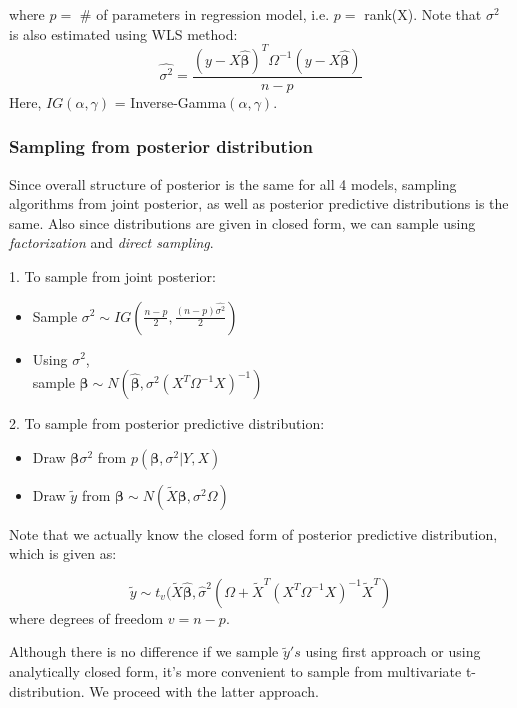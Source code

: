 \documentclass[11pt,twocolumn]{asaproc}
\begin{document}
where $p = $ \# of parameters in regression model, i.e. $p =$ rank(X). Note that $\sigma^2$ is also estimated using WLS method: $$\hat{\sigma^2} = \frac{(y-X\hat{\pmb{\beta}})^T \Omega^{-1} (y-X\hat{\pmb{\beta}})}{n-p}$$   Here, $IG(\alpha, \gamma)$ = Inverse-Gamma$(\alpha, \gamma)$. 


\subsubsection{Sampling from posterior distribution}

Since overall structure of posterior is the same for all 4 models, sampling algorithms from joint posterior, as well as posterior predictive distributions is the same. Also since distributions are given in closed form, we can sample using \textit{factorization} and \textit{direct sampling}.

\vspace{5mm}

1. To sample from joint posterior:

\begin{itemize}
\item Sample $\sigma^2 \sim IG (\frac{n-p}{2}, \frac{(n-p)\hat{\sigma^2}}{2})$
\item Using $\sigma^2$, \\ sample $\pmb{\beta} \sim N(\hat{\pmb{\beta}}, \sigma^2(X^{T}\Omega^{-1}X)^{-1})$
\end{itemize}


2. To sample from posterior predictive distribution:

\begin{itemize}
\item Draw $\pmb{\beta} \sigma^2$ from $p(\pmb{\beta}, \sigma^2 | Y, X)$
\item Draw $\tilde{y}$ from $\pmb{\beta} \sim N(\tilde{X}\pmb{\beta}, \sigma^2\Omega)$
\end{itemize}

Note that we actually know the closed form of posterior predictive distribution, which is given as: 

$$\tilde{y} \sim t_{v}(\tilde{X}\hat{\pmb{\beta}}, \hat{\sigma}^2(\Omega + \tilde{X}^T (X^T \Omega^{-1} X) ^{-1}\tilde{X}^T)$$ where degrees of freedom $v = n-p$. 

Although there is no difference if we sample $\tilde{y}'s$ using first approach or using analytically closed form, it's more convenient to sample from multivariate t-distribution. We proceed with the latter approach. 
\end{document}
